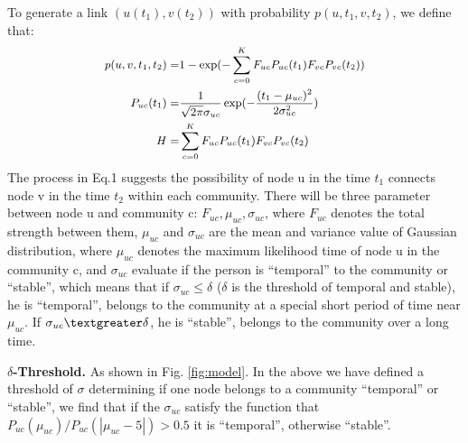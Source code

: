 To generate a link $(u(t_1), v(t_2))$ with probability $p(u,t_1,v,t_2)$, we define that:
\begin{equation}
\small
\begin{aligned}
p(u,v,t_1,t_2) =& 1-\exp(-\sum_{c=0}^{K}F_{uc}P_{uc}(t_1)F_{vc}P_{vc}(t_2))\\
P_{uc}(t_1) =& \frac{1}{\sqrt{2\pi}\sigma_{uc}}\exp(-\frac{(t_1-\mu_{uc})^2}{2\sigma_{uc}^{2}})\\
H=&\sum_{c=0}^{K}F_{uc}P_{uc}(t_1)F_{vc}P_{vc}(t_2)
\end{aligned}
\end{equation}
The process in Eq.1 suggests the possibility of node u in the time $t_1$ connects node v in the time $t_2$ within each community. There will be three parameter between node u and community c: $F_{uc}, \mu_{uc}, \sigma_{uc}$, where $F_{uc}$ denotes the total strength between them, $\mu_{uc}$ and $ \sigma_{uc} $ are the mean and variance value of Gaussian distribution, where $\mu_{uc}$ denotes the  maximum likelihood time of node u in the community c, and $\sigma_{uc}$ evaluate if the person is ``temporal'' to the community or ``stable'', which means that if $\sigma_{uc} \le \delta$ ($\delta $ is the threshold of temporal and stable), he is ``temporal'', belongs to the community at a special short period of time  near $\mu_{uc}$. If $\sigma_{uc} \textgreater \delta$, he is ``stable'', belongs to the community over a  long time.

$\delta$\textbf{-Threshold.} As shown in Fig. \ref{fig:model}. In the above we have defined a threshold of $\sigma$ determining if one node belongs to a community ``temporal'' or ``stable'', we find that if the $\sigma_{uc}$ satisfy the function that $P_{uc}(\mu_{uc})/P_{uc}(|\mu_{uc}-5|)> 0.5 $ it is ``temporal'', otherwise ``stable''.

